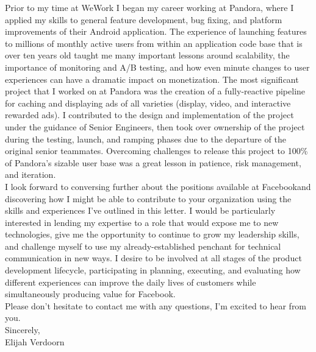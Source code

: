 \documentclass[9pt,letterpaper]{article}
\newcommand{\company}{Facebook}
\begin{document}
\noindent Prior to my time at WeWork I began my career working at Pandora, where I applied my skills to general feature development, bug fixing, and platform improvements of their Android application. The experience of launching features to millions of monthly active users from within an application code base that is over ten years old taught me many important lessons around scalability, the importance of monitoring and A/B testing, and how even minute changes to user experiences can have a dramatic impact on monetization. The most significant project that I worked on at Pandora was the creation of a fully-reactive pipeline for caching and displaying ads of all varieties (display, video, and interactive rewarded ads). I contributed to the design and implementation of the project under the guidance of Senior Engineers, then took over ownership of the project during the testing, launch, and ramping phases due to the departure of the original senior teammates. Overcoming challenges to release this project to 100\% of Pandora's sizable user base was a great lesson in patience, risk management, and iteration.\\

\noindent I look forward to conversing further about the positions available at \company \space and discovering how I might be able to contribute to your organization using the skills and experiences I've outlined in this letter. I would be particularly interested in lending my expertise to a role that would expose me to new technologies, give me the opportunity to continue to grow my leadership skills, and challenge myself to use my already-established penchant for technical communication in new ways. I desire to be involved at all stages of the product development lifecycle, participating in planning, executing, and evaluating how different experiences can improve the daily lives of customers while simultaneously producing value for \company.\\

\noindent Please don't hesitate to contact me with any questions, I'm excited to hear from you.\\

\noindent Sincerely,
\\\noindent
Elijah Verdoorn
\end{document}
